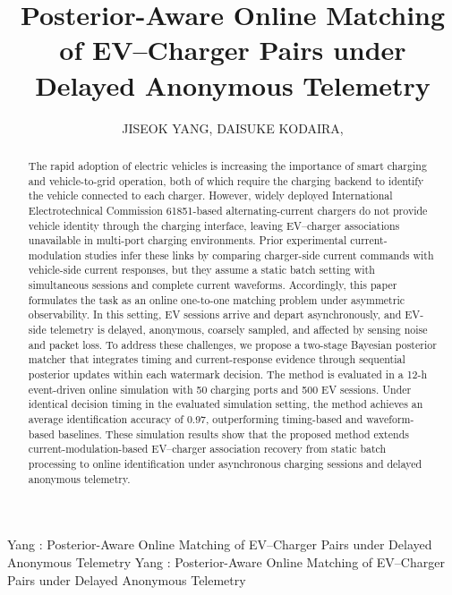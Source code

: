 \documentclass{ieeeaccess}
\begin{document}

    \title{Posterior-Aware Online Matching of EV--Charger Pairs under Delayed Anonymous Telemetry}

    \author{\uppercase{Jiseok Yang},
        \uppercase{Daisuke Kodaira}, }

    \address[1]{Degree Programs in Systems and Information Engineering, Graduate School of Science and Technology, University of Tsukuba, Tsukuba 305-8573, Japan}
    \address[2]{Institute of Systems and Information Engineering, University of Tsukuba, Tsukuba 305-8573, Japan}


    \markboth
    {Yang \headeretal: Posterior-Aware Online Matching of EV--Charger Pairs under Delayed Anonymous Telemetry}
    {Yang \headeretal: Posterior-Aware Online Matching of EV--Charger Pairs under Delayed Anonymous Telemetry}


                    \begin{abstract}
        The rapid adoption of electric vehicles is increasing the importance of smart charging and vehicle-to-grid operation, both of which require the charging backend to identify the vehicle connected to each charger. However, widely deployed International Electrotechnical Commission 61851-based alternating-current chargers do not provide vehicle identity through the charging interface, leaving EV--charger associations unavailable in multi-port charging environments. Prior experimental current-modulation studies infer these links by comparing charger-side current commands with vehicle-side current responses, but they assume a static batch setting with simultaneous sessions and complete current waveforms. Accordingly, this paper formulates the task as an online one-to-one matching problem under asymmetric observability. In this setting, EV sessions arrive and depart asynchronously, and EV-side telemetry is delayed, anonymous, coarsely sampled, and affected by sensing noise and packet loss. To address these challenges, we propose a two-stage Bayesian posterior matcher that integrates timing and current-response evidence through sequential posterior updates within each watermark decision. The method is evaluated in a 12-h event-driven online simulation with 50 charging ports and 500 EV sessions. Under identical decision timing in the evaluated simulation setting, the method achieves an average identification accuracy of 0.97, outperforming timing-based and waveform-based baselines. These simulation results show that the proposed method extends current-modulation-based EV--charger association recovery from static batch processing to online identification under asynchronous charging sessions and delayed anonymous telemetry.
    \end{abstract}
\end{document}
